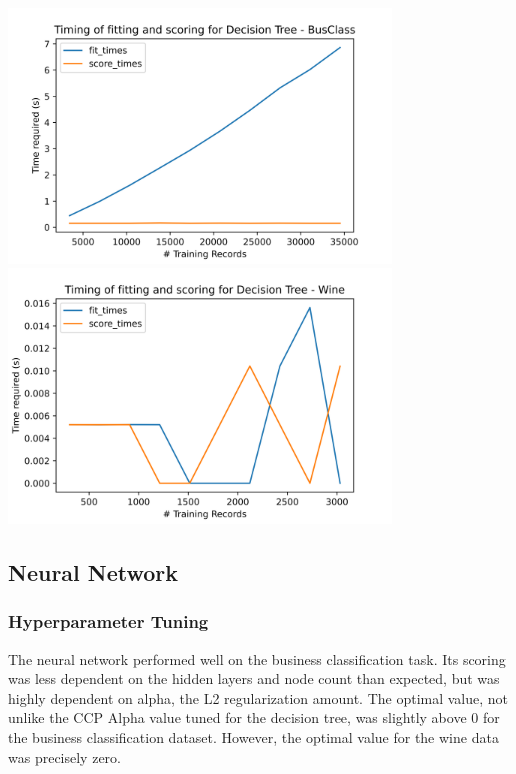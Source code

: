 \documentclass[
	letterpaper, %
]{jdf}
\begin{document}
\includegraphics[width=4in]{Figures/BusClass-0920/DT/time_curve.png}
\includegraphics[width=4in]{Figures/Wine-0921/DT/time_curve.png}

\subsection{Neural Network}

\subsubsection{Hyperparameter Tuning}

The neural network performed well on the business classification task. Its scoring was less dependent on the hidden layers and node count than expected, but was highly dependent on alpha, the L2 regularization amount. The optimal value, not unlike the CCP Alpha value tuned for the decision tree, was slightly above 0 for the business classification dataset. However, the optimal value for the wine data was precisely zero.
\end{document}
